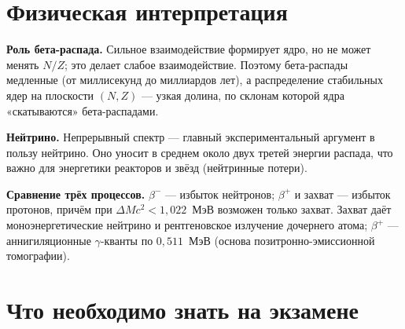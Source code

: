 \section{Физическая интерпретация}

\textbf{Роль бета-распада.} Сильное взаимодействие формирует ядро, но не может менять $N/Z$; это делает слабое взаимодействие.
Поэтому бета-распады медленные (от миллисекунд до миллиардов лет), а распределение стабильных ядер на плоскости $(N,Z)$ —
узкая долина, по склонам которой ядра «скатываются» бета-распадами.

\textbf{Нейтрино.} Непрерывный спектр — главный экспериментальный аргумент в пользу нейтрино. Оно уносит в среднем около
двух третей энергии распада, что важно для энергетики реакторов и звёзд (нейтринные потери).

\textbf{Сравнение трёх процессов.} $\beta^-$ — избыток нейтронов; $\beta^+$ и захват — избыток протонов, причём при $\Delta Mc^2<1{,}022$~МэВ
возможен только захват. Захват даёт моноэнергетические нейтрино и рентгеновское излучение дочернего атома; $\beta^+$ —
аннигиляционные $\gamma$-кванты по $0{,}511$~МэВ (основа позитронно-эмиссионной томографии).

\section{Что необходимо знать на экзамене}

